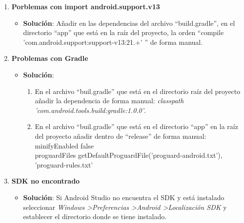 \begin{enumerate}
\begin{itemize}
				
			\end{itemize}
			
		\newpage
		\item {\bf Porblemas con import android.support.v13}
			\begin{itemize}
				\item {\bf Solución}: Añadir en las dependencias del archivo ``build.gradle'', en el directorio ``app'' que está en la raíz del proyecto, la orden ``compile 'com.android.support:support-v13:21.+' '' de forma manual.
				
				\noindent
				
			\end{itemize}
			
		\newpage
		\item {\bf Problemas con Gradle}
			\begin{itemize}
				\item {\bf Solución}:
					\begin{enumerate}
						\item En el archivo ``buil.gradle'' que está en el directorio raíz del proyecto añadir la dependencia de forma manual: {\it classpath 'com.android.tools.build:gradle:1.0.0'}.
						\item En el archivo ``buil.gradle'' que está en el directorio ``app'' en la raíz del proyecto añadir dentro de ``release'' de forma manual:
							minifyEnabled false\\
							proguardFiles getDefaultProguardFile('proguard-android.txt'), 'proguard-rules.txt'
					\end{enumerate}
					\noindent
					
					
			\end{itemize}
		
		\newpage
		\item {\bf SDK no encontrado}
			\begin{itemize}
				\item {\bf Solución}: Si Android Studio no encuentra el SDK y está instalado seleccionar {\it Windows \textgreater Preferencias \textgreater Android \textgreater Localización SDK} y establecer el directorio donde se tiene instalado.
			\end{itemize}
	\end{enumerate}
